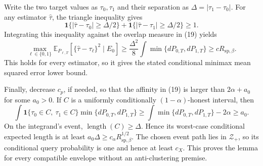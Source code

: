 Write the two target values as \(\tau_0,\tau_1\) and their separation as
\(\Delta=\lvert\tau_1-\tau_0\rvert\).  For any estimator
\(\widehat\tau\), the triangle inequality gives
\[
\mathbf 1\{\lvert\widehat\tau-\tau_0\rvert\ge\Delta/2\}
+\mathbf 1\{\lvert\widehat\tau-\tau_1\rvert\ge\Delta/2\}\ge1.
\]
Integrating this inequality against the overlap measure in (19) yields
\[
\max_{\ell\in\{0,1\}}
\mathbb E_{P_{\ell,T}}
[\{\widehat\tau-\tau_\ell\}^2\mid E_0]
\ge \frac{\Delta^2}{8}\int\min\{dP_{0,T},dP_{1,T}\}
\ge cR_{\mathrm{sp},\beta}.
\tag{21}
\]
This holds for every estimator, so it gives the stated conditional minimax
mean squared error lower bound.

Finally, decrease \(c_p\), if needed, so that the affinity in (19) is larger
than \(2\alpha+a_0\) for some \(a_0>0\).  If \(C\) is a uniformly
conditionally \((1-\alpha)\)-honest interval, then
\[
\int \mathbf 1\{\tau_0\in C,\ \tau_1\in C\}
\min\{dP_{0,T},dP_{1,T}\}
\ge \int\min\{dP_{0,T},dP_{1,T}\}-2\alpha
\ge a_0.
\]
On the integrand's event, \(\operatorname{length}(C)\ge\Delta\).  Hence its
worst-case conditional expected length is at least
\(a_0\Delta\ge c_\alpha R_{\mathrm{sp},\beta}^{1/2}\).  The chosen event
path lies in \(\mathcal Z_+\), so its conditional query probability is one
and hence at least \(c_X\).  This proves the lemma for every compatible
envelope without an anti-clustering premise.
